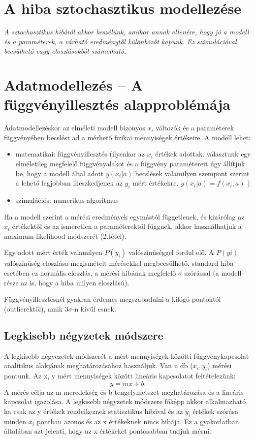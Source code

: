 \documentclass[12pt]{article}
\theoremstyle{plain}
\begin{document}
\section{A hiba sztochasztikus modellezése}
\textit{A sztochasztikus hibáról akkor beszélünk, amikor annak ellenére, hogy jó a modell és a paraméterek, a várható eredménytől különbözőt kapunk. Ez szimulációval becsülhető vagy eloszlásokból számolható. 
}

\section{Adatmodellezés – A függvényillesztés alapproblémája}

Adatmodellezéskor az elméleti modell bizonyos $x_i$ változók és a paraméterek függvényében becslést ad a mérhető fizikai mennyiségek értékeire. A modell lehet:
\begin{itemize}
    \item matematikai: függvényillesztés (ilyenkor az $x_i$ értékek adottak. választunk egy elméletileg megfelelő függvényalakot és a függvény paramétereit úgy állítjuk be, hogy a modell által adott $y(x_i
|a)$ becslések valamilyen szempont szerint a lehető legjobban illeszkedjenek az $y_i$ mért értékekre. $y(x_i
|a) = f(x_i, a)$ )
    \item szimulációs: numerikus algoritmus
\end{itemize}
Ha a modell szerint a mérési eredmények egymástól függetlenek, és kizárólag az $x_i$ értékektől és az ismeretlen a paraméterektől függnek, akkor használhatjuk a maximum likelihood módszerét (2.tétel). 


Egy adott mért érték valamilyen $P(y_i)$ valószínűséggel fordul elő. A $P(yi)$ valószínűség eloszlása megismételt mérésekkel megbecsülhető, standard hiba esetében ez normális eloszlás, a mérési hibának
megfelelő $\sigma$ szórással (a modell része az is, hogy a hiba milyen eloszlású). 

Függvényillesztésnél gyakran érdemes megszabadulni a kilógó pontoktól (outlierektől), amik $3 \sigma$-n kívűl esnek. 

\subsection{Legkisebb négyzetek módszere}
A legkisebb négyezetek módszerét a mért mennyiségek közötti függvénykapcsolat analitikus alakjának meghatározásához használjuk. Van n db ($x_i, y_i$) mérési pontunk. Az x, y mért mennyiségek között lineáris kapcsolatot feltételezünk:
$$ y = mx+b. $$ A mérés célja az m meredekség és b tengelymetszet meghatározása és a lineáris kapcsolat igazolása. A legkisebb négyzetek módszere főképp akkor alkalmazható, ha csak az y értékek rendelkeznek statisztikus hibával és az $y_i$ értékek szórása minden $x_i$ pontban azonos és az x értékeknek nincs hibája. Ez a gyakorlatban általában azt jelenti, hogy az x értékeket pontosabban tudjuk mérni. 
\end{document}
